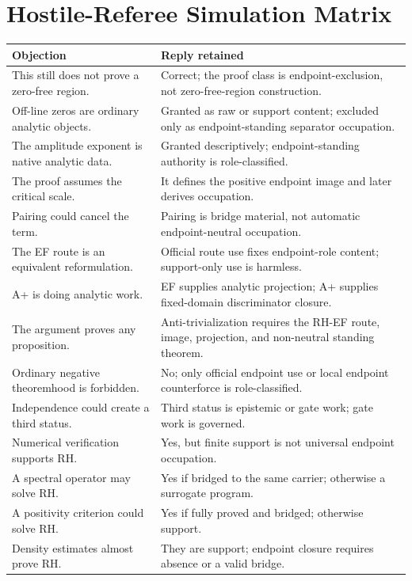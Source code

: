 \documentclass[11pt]{article}
\begin{document}
\section{Hostile-Referee Simulation Matrix}\label{app:hostile-sim}

\begingroup\small
\begin{longtable}{L{0.35\textwidth}L{0.55\textwidth}}
\toprule
\textbf{Objection} & \textbf{Reply retained}\\
\midrule
This still does not prove a zero-free region. & Correct; the proof class is endpoint-exclusion, not zero-free-region construction.\\
Off-line zeros are ordinary analytic objects. & Granted as raw or support content; excluded only as endpoint-standing separator occupation.\\
The amplitude exponent is native analytic data. & Granted descriptively; endpoint-standing authority is role-classified.\\
The proof assumes the critical scale. & It defines the positive endpoint image and later derives occupation.\\
Pairing could cancel the term. & Pairing is bridge material, not automatic endpoint-neutral occupation.\\
The EF route is an equivalent reformulation. & Official route use fixes endpoint-role content; support-only use is harmless.\\
A+ is doing analytic work. & EF supplies analytic projection; A+ supplies fixed-domain discriminator closure.\\
The argument proves any proposition. & Anti-trivialization requires the RH-EF route, image, projection, and non-neutral standing theorem.\\
Ordinary negative theoremhood is forbidden. & No; only official endpoint use or local endpoint counterforce is role-classified.\\
Independence could create a third status. & Third status is epistemic or gate work; gate work is governed.\\
Numerical verification supports RH. & Yes, but finite support is not universal endpoint occupation.\\
A spectral operator may solve RH. & Yes if bridged to the same carrier; otherwise a surrogate program.\\
A positivity criterion could solve RH. & Yes if fully proved and bridged; otherwise support.\\
Density estimates almost prove RH. & They are support; endpoint closure requires absence or a valid bridge.\\

\end{longtable}
\end{document}
